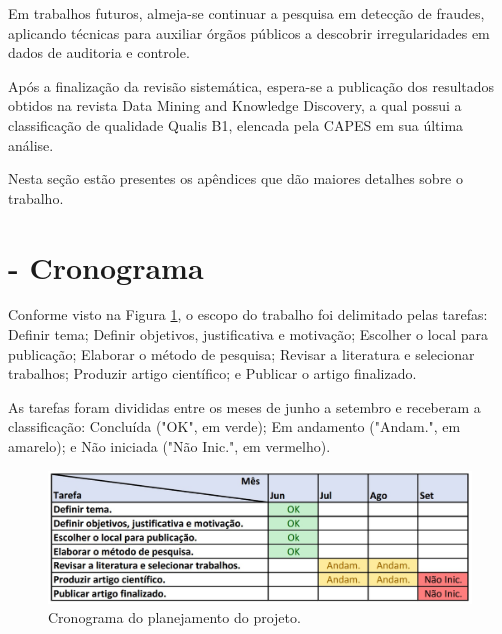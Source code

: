 \documentclass[smallextended]{svjour3}
\begin{document}
Em trabalhos futuros, almeja-se continuar a pesquisa em detecção de fraudes, aplicando técnicas para auxiliar órgãos públicos a descobrir irregularidades em dados de auditoria e controle.

Após a finalização da revisão sistemática, espera-se a publicação dos resultados obtidos na revista Data Mining and Knowledge Discovery, a qual possui a classificação de qualidade Qualis B1, elencada pela CAPES em sua última análise. 

	
	
	
	\begin{appendices}
		
		Nesta seção estão presentes os apêndices que dão maiores detalhes sobre o trabalho.
		
		\section{- Cronograma}
			Conforme visto na Figura \ref{fig:cronograma}, o escopo do trabalho foi delimitado pelas tarefas: Definir tema; Definir objetivos, justificativa e motivação; Escolher o local para publicação; Elaborar o método de pesquisa; Revisar a literatura e selecionar trabalhos; Produzir artigo científico; e Publicar o artigo finalizado. 
			
			As tarefas foram divididas entre os meses de junho a setembro e receberam a classificação: Concluída ("OK", em verde); Em andamento ("Andam.", em amarelo); e Não iniciada ("Não Inic.", em vermelho). 
			
			\begin{figure}[!ht]
				\centering
				\includegraphics[width=1\textwidth]{imagens/cronograma2.jpg}
				\caption{Cronograma do planejamento do projeto.}
				\label{fig:cronograma}
			\end{figure}
	\end{appendices}
	
\end{document}
